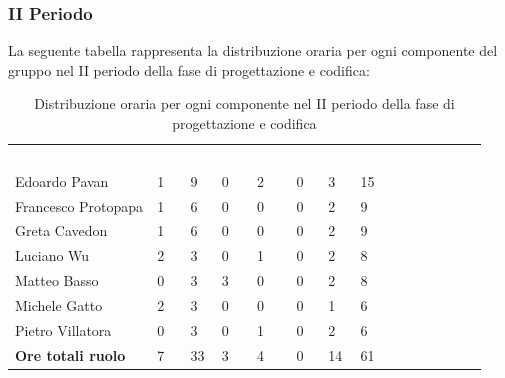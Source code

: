 \subsubsection{II Periodo}
La seguente tabella rappresenta la distribuzione oraria per ogni componente del gruppo nel II periodo della fase di progettazione e codifica:
\begin{table}[H]
\begin{center}
\renewcommand{\arraystretch}{1.25}
\begin{tabular}{ m{}<{\centering}  m{}<{\centering} m{}<{\centering} m{}<{\centering}  m{}<{\centering}  m{}<{\centering}  m{}<{\centering}  m{}<{\centering}   }
	\rowcolor{darkblue}
	\textcolor{white}{\textbf{Componente}} &\textcolor{white}{\textbf{Re}}&\textcolor{white}{\textbf{Pt}}&\textcolor{white}{\textbf{An}}&\textcolor{white}{\textbf{Am}}&\textcolor{white}{\textbf{Pr}}&\textcolor{white}{\textbf{Ve}}&\textcolor{white}{\textbf{Ore complessive}}\\ 
	Edoardo Pavan & 1 & 9 & 0 & 2 & 0 & 3 & 15 \\	
	
	Francesco Protopapa & 1 & 6 & 0 & 0 & 0 & 2 & 9 \\

	Greta Cavedon & 1 & 6 & 0 & 0 & 0 & 2 & 9 \\
	
	Luciano Wu & 2 & 3 & 0 & 1 & 0 & 2 & 8 \\
	
	Matteo Basso & 0 & 3 & 3 & 0 & 0 & 2 & 8 \\
	
	Michele Gatto & 2 & 3 & 0 & 0 & 0 & 1 & 6 \\
	
	Pietro Villatora & 0 & 3 & 0 & 1 & 0 & 2 & 6 \\
	
	\textbf{Ore totali ruolo} & 7 & 33 & 3 & 4 & 0 & 14 & 61 \\

\end{tabular}
\caption{Distribuzione oraria per ogni componente nel II periodo della fase di progettazione e codifica}
\end{center}
\end{table}

